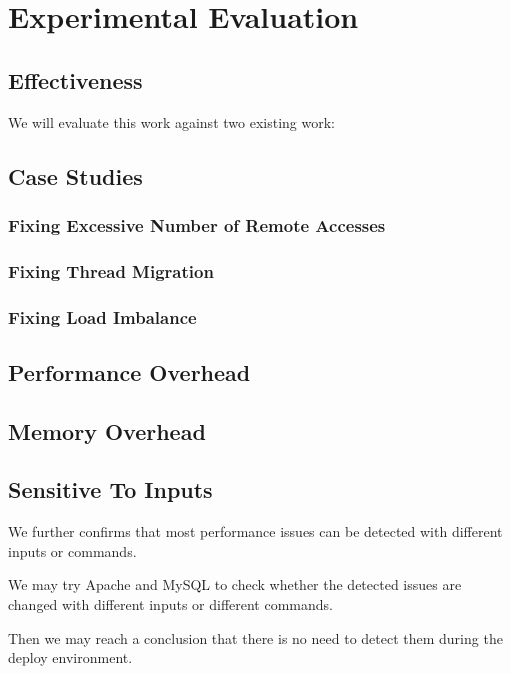\section{Experimental Evaluation}
\label{sec:evaluation}

\subsection{Effectiveness}


We will evaluate this work against two existing work:

%



\subsection{Case Studies}
\label{sec:casestudies}

\subsubsection{Fixing Excessive Number of Remote Accesses}

\subsubsection{Fixing Thread Migration} 

\subsubsection{Fixing Load Imbalance}
\subsection{Performance Overhead}

\subsection{Memory Overhead}

\subsection{Sensitive To Inputs}
We further confirms that most performance issues can be detected with different inputs or commands. 

We may try Apache and MySQL to check whether the detected issues are changed with different inputs or different commands. 

Then we may reach a conclusion that there is no need to detect them during the deploy environment. 
